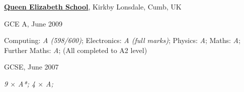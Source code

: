 \documentclass[10pt]{article}
\newenvironment{outerlist}[1][\enskip\textbullet]%
        {\begin{itemize}[#1]}{\end{itemize}%
         \vspace{-.6\baselineskip}}
\newenvironment{innerlist}[1][\enskip\textbullet]%
        {\begin{compactitem}[#1]}{\end{compactitem}}
\newcommand{\blankline}{\quad\pagebreak[2]}
\begin{document}
\blankline

\textbf{\href{http://www.queenelizabeth.cumbria.sch.uk/}{Queen Elizabeth School}}, Kirkby Lonsdale, Cumb, UK
\begin{outerlist}
\item[] GCE A, June 2009
        \begin{innerlist}
        \item Computing: \emph{A (598/600)}; Electronics: \emph{A (full marks)}; Physics: \emph{A}; Maths: \emph{A}; Further Maths: \emph{A}; (All completed to A2 level)
        \end{innerlist}

\item[] GCSE, June 2007
        \begin{innerlist}
        \item \emph{9 $\times$ A*; 4 $\times$ A;}
        \end{innerlist}	
\end{outerlist}
\end{document}
